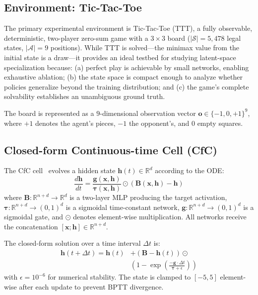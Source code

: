 \documentclass[conference]{IEEEtran}
\newcommand{\R}{\mathbb{R}}
\begin{document}
\subsection{Environment: Tic-Tac-Toe}
\label{ssec:env}

The primary experimental environment is Tic-Tac-Toe (TTT), a fully observable, deterministic, two-player zero-sum game with a $3 \times 3$ board ($|\mathcal{S}| = 5{,}478$ legal states, $|\mathcal{A}| = 9$ positions). While TTT is solved---the minimax value from the initial state is a draw---it provides an ideal testbed for studying latent-space specialization because:
(a) perfect play is achievable by small networks, enabling exhaustive ablation;
(b) the state space is compact enough to analyze whether policies generalize beyond the training distribution; and
(c) the game's complete solvability establishes an unambiguous ground truth.

The board is represented as a $9$-dimensional observation vector $\bm{o} \in \{-1, 0, +1\}^9$, where $+1$ denotes the agent's pieces, $-1$ the opponent's, and $0$ empty squares.


\subsection{Closed-form Continuous-time Cell (CfC)}
\label{ssec:cfc}

The CfC cell~\cite{hasani2021closed} evolves a hidden state $\bm{h}(t) \in \R^{d}$ according to the ODE:
\begin{equation}
\label{eq:cfc_ode}
\frac{d\bm{h}}{dt} = \frac{\bm{g}(\bm{x}, \bm{h})}{\bm{\tau}(\bm{x}, \bm{h})} \odot \left(\bm{B}(\bm{x}, \bm{h}) - \bm{h}\right)
\end{equation}
where $\bm{B}: \R^{n+d} \to \R^d$ is a two-layer MLP producing the target activation, $\bm{\tau}: \R^{n+d} \to (0,1)^d$ is a sigmoidal time-constant network, $\bm{g}: \R^{n+d} \to (0,1)^d$ is a sigmoidal gate, and $\odot$ denotes element-wise multiplication. All networks receive the concatenation $[\bm{x}; \bm{h}] \in \R^{n+d}$.

The closed-form solution over a time interval $\Delta t$ is:
\begin{equation}
\label{eq:cfc_closed}
\begin{aligned}
\bm{h}(t + \Delta t) = \bm{h}(t) &+ \left(\bm{B} - \bm{h}(t)\right) \odot \\
&\left(1 - \exp\!\left(\frac{-\bm{g} \cdot \Delta t}{\bm{\tau} + \epsilon}\right)\right)
\end{aligned}
\end{equation}
with $\epsilon = 10^{-6}$ for numerical stability. The state is clamped to $[-5, 5]$ element-wise after each update to prevent BPTT divergence.
\end{document}
